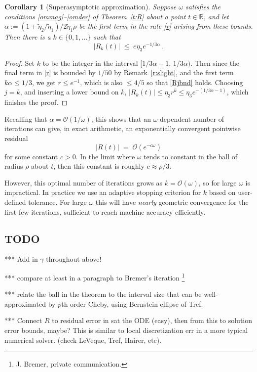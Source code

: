 \documentclass[10pt]{article}
\newcommand{\R}{\mathbb{R}}
\newcommand{\bigO}{{\mathcal O}}
\newtheorem{cor}[thm]{Corollary}
\newcommand{\om}{\omega}
\newcommand{\te}{\tilde\eta}
\begin{document}
\begin{cor}[Superasymptotic approximation]\label{super}
  Suppose $\om$ satisfies the conditions \eqref{ommag}--\eqref{omder}
  of Theorem~\ref{t:R}
  about a point $t\in\R$,
  and let $\alpha := (1+\te_2/\te_1)/2\te_1\rho$ be the
  first term in the rate \eqref{r} arising from these bounds.
  Then there is a $k\in\{0,1,\dots\}$ such that
  $$
  |R_k(t)| \; \le \; e \eta_3 e^{-1/3\alpha}~.
  $$
\end{cor}
\begin{proof}
  Set $k$ to be the integer in the interval $[1/3\alpha-1, \, 1/3\alpha)$.
    Then since the final term in \eqref{r} is bounded by $1/50$
    by Remark~\ref{r:slight}, and the
    first term $k\alpha \le 1/3$, we get $r\le e^{-1}$, which
    is also $\le 4/5$ so that \eqref{Rjbnd} holds.
    Choosing $j=k$, and inserting a lower bound on $k$,
    $|R_k(t)| \le \eta_3 r^k \le \eta_3 e^{-(1/3\alpha-1)}$, which
    finishes the proof.
  \end{proof}
Recalling that $\alpha = \bigO(1/\om)$, this
shows that an $\om$-dependent
number of iterations can give, in exact arithmetic, an
exponentially convergent pointwise residual
$$
|R(t)| \;=\; \bigO(e^{-c\om})
$$
for some constant $c>0$.
In the limit where
$\om$ tends to constant in the ball of radius $\rho$ about $t$, then
this constant is roughly $c\approx \rho/3$.


However, this optimal number of iterations grows as $k = \bigO(\om)$,
so for large $\om$ is impractical.
In practice we use an adaptive stopping criterion for $k$ based
on user-defined tolerance.
For large $\om$ this will have \textit{nearly} geometric convergence
for the first few iterations, sufficient to reach
machine accuracy efficiently.



\subsection{TODO}

*** Add in $\gamma$ throughout above!

*** compare at least in a paragraph to Bremer's iteration
\footnote{J. Bremer, private communication.}

*** relate the ball in the theorem to the interval size that
can be well-approximated by $p$th order Cheby,
using Bernstein ellipse of Tref.


*** Connect $R$ to residual error in sat the ODE (easy),
then from this to solution error bounds, maybe?
This is similar to local discretization err
in a more typical numerical solver.
(check LeVeque, Tref, Hairer, etc).






\end{document}
